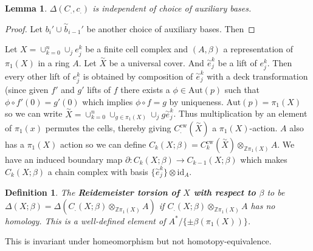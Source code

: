 \documentclass{article}
\newtheorem{definition}[theorem]{Definition}
\newtheorem{lemma}[theorem]{Lemma}
\begin{document}
\begin{lemma}
$\Delta(C_.,c_.)$ is independent of choice of auxiliary bases.
\end{lemma}
\begin{proof}
Let $b_i'\cup\overset{\sim}{b}_{i-1}'$ be another choice of auxiliary bases. Then 
\end{proof}


\noindent Let $X=\cup_{k=0}^n\cup_je_j^k$ be a finite cell complex and $(A,\beta)$ a representation of $\pi_1(X)$ in a ring $A$. Let $\overset{\sim}{X}$ be a universal cover. And $\overset{\sim}{e}_j^k$ be a lift of $e_j^k$. Then every other lift of $e_j^k$ is obtained by composition of $\overset{\sim}{e}_j^k$ with a deck transformation (since given $f'$ and $g'$ lifts of $f$ there exists a $\phi\in\text{Aut}(p)$ such that $\phi\circ f'(0)=g'(0)$ which implies $\phi\circ f=g$ by uniqueness. $\text{Aut}(p)=\pi_1(X)$ so we can write $\overset{\sim}{X}=\cup_{k=0}^n\cup_{g\in\pi_1(X)}\cup_jg\overset{\sim}{e}_j^k$. Thus multiplication by an element of $\pi_1(x)$ permutes the cells, thereby giving $C_.^\text{cw}(\overset{\sim}{X})$ a $\pi_1(X)$-action. $A$ also has a $\pi_1(X)$ action so we can define $C_k(X;\beta)=C_k^\text{cw}(\overset{\sim}{X})\otimes_{\mathbb{Z}\pi_1(X)} A$. We have an induced boundary map $\partial\colon C_k(X;\beta)\to C_{k-1}(X;\beta)$ which makes $C_k(X;\beta)$ a chain complex with basis $\{\overset{\sim}{e}_j^k\}\otimes\text{id}_A$.

\begin{definition}
The \textbf{Reidemeister torsion of $X$ with respect to $\beta$} to be $\Delta(X;\beta)=\Delta(C_.(X;\beta)\otimes_{\mathbb{Z}\pi_1(X)}A)$ if $C_.(X;\beta)\otimes_{\mathbb{Z}\pi_1(X)}A$ has no homology. This is a well-defined element of $A^*/\{\pm\beta(\pi_1(X))\}$.
\end{definition}

\noindent This is invariant under homeomorphism but not homotopy-equivalence.
\end{document}
